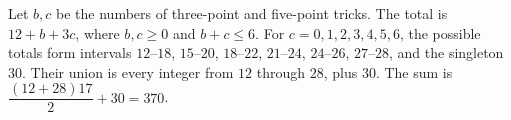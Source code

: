 Let $b,c$ be the numbers of three-point and five-point tricks. The total is $12+b+3c$, where $b,c\ge0$ and $b+c\le6$. For $c=0,1,2,3,4,5,6$, the possible totals form intervals $12$--$18$, $15$--$20$, $18$--$22$, $21$--$24$, $24$--$26$, $27$--$28$, and the singleton $30$. Their union is every integer from $12$ through $28$, plus $30$. The sum is $\dfrac{(12+28)17}{2}+30=\boxed{370}$.
